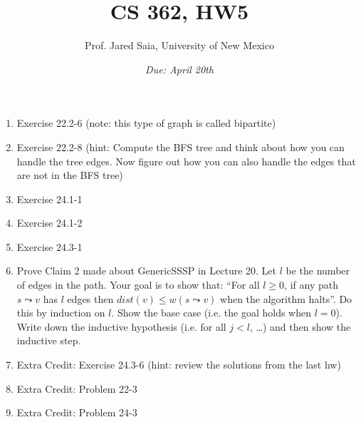 \documentclass[11pt]{article}
\begin{document}
\title{CS 362, HW5}

\author {Prof. Jared Saia, University of New Mexico}

\date{\emph{Due: April 20th}}
\maketitle

\begin{enumerate}


\item Exercise 22.2-6 (note: this type of graph is called bipartite)

\item Exercise 22.2-8 (hint: Compute the BFS tree and think about how
you can handle the tree edges.  Now figure out how you can also handle
the edges that are not in the BFS tree)


\item Exercise 24.1-1

\item Exercise 24.1-2

\item Exercise 24.3-1


\item Prove Claim 2 made about GenericSSSP in Lecture 20.  Let $l$ be
the number of edges in the path.  Your goal is to show that: ``For all
$l\geq 0$, if any path $s \leadsto v$ has $l$ edges then $dist(v) \leq
w(s \leadsto v)$ when the algorithm halts''.  Do this by induction on
$l$.  Show the base case (i.e. the goal holds when $l=0$).  Write down
the inductive hypothesis (i.e. for all $j<l$, \dots ) and then show
the inductive step.

\item Extra Credit: Exercise 24.3-6 (hint: review the solutions from the last hw)

\item Extra Credit: Problem 22-3

\item Extra Credit: Problem 24-3


\end{enumerate}
\end{document}
